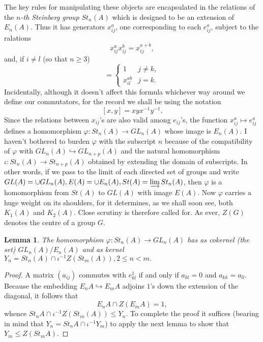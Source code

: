 \documentclass[openany,leqno]{book}  %
\newtheorem{lemma}[theorem]{Lemma}
\begin{document}
The key rules for manipulating these objects are encapsulated in the relations of the {\em $n$-th Steinberg group} $St_n(A)$ which is designed to be an extension of $E_n(A)$. Thus it has generators $x_{ij}^a$, one corresponding to each $e_{ij}^a$, subject to the ralations
\[x_{ij}^a x_{ij}^b=x_{ij}^{a+b},\]
and, if $i\neq l$ (so that $n\geqslant 3$)
\begin{equation*}
	[x_{ij}^a,x_{kj}^b]=\left\{
	\begin{array}{cc}
	1 & j\neq k,\\
	x_{il}^{ab} & j=k.
	\end{array}
	\right.
\end{equation*}
Incidentally, although it doesn't affect this formula whichever way around we define our commutators, for the record we shall be using the notation
\[[x,y]=xyx^{-1}y^{-1}.\]
Since the relations between $x_{ij}$'s are also valid among $e_{ij}$'s, the function $x_{ij}^a \mapsto e_{ij}^a$ defines a homomorphism $\varphi\colon  St_n(A)\rightarrow GL_n(A)$ whose image is $E_n(A)$. I haven't bothered to burden $\varphi$ with the subscript $n$ because of the compatibility of $\varphi$ with $GL_n(A)\hookrightarrow GL_{n+p}(A)$ and the natural homomorphism $\iota\colon St_n(A)\rightarrow St_{n+p}(A)$ obtained by extending the domain of subscripts. In other words, if we pass to the limit of each directed set of groups and write $GL(A)=\cup GL_n(A), E(A)=\cup E_n(A), St(A)=\varinjlim St_n(A)$, then $\varphi$ is a homomorphism from $St(A)$ to $GL(A)$ with image $E(A)$. Now $\varphi$ carries a huge weight on its shoulders, for it determines, as we shall soon see, both $K_1(A)$ and $K_2(A)$. Close scrutiny is therefore called for. As ever, $Z(G)$ denotes the centre of a group $G$.
\begin{lemma}\label{1.1}
The homomorphism $\varphi\colon  St_n(A)\rightarrow GL_n(A)$ has as cokernel (the set) $GL_n(A)/E_n(A)$ and as kernel $Y_n=St_n(A)\cap \iota^{-1}Z(St_m(A)), 2\leqslant n < m.$
\end{lemma}
\begin{proof}
A matrix $(a_{ij})$ commutes with $e_{kl}^1$ if and only if $a_{kl}=0$ and $a_{kk}=a_{ll}$. Because the embedding $E_nA\hookrightarrow E_mA$ adjoins $1$'s down the extension of the diagonal, it follows that
\[E_nA\cap Z(E_mA)=1,\]
whence
$St_nA\cap \iota^{-1}Z(St_m(A))\leqslant Y_n.$
To complete the proof it suffices (bearing in mind that $Y_n=St_nA\cap \iota^{-1}Y_m$) to apply the next lemma to show that $Y_m\leqslant Z(St_mA)$.
\end{proof}
\end{document}
